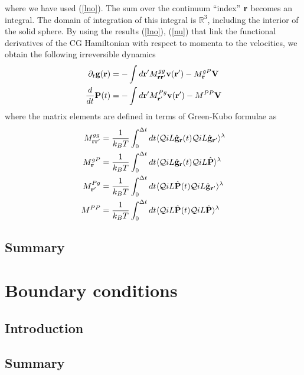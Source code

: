 \documentclass[a4paper,openright,12pt]{book}
\begin{document}
where we have  used (\ref{lno}). The sum over  the continuum ``index''
${\bf  r}$ becomes  an integral.   The domain  of integration  of this
integral  is  $\mathbb{R}^3$,  including  the interior  of  the  solid
sphere. By  using the  results (\ref{lno}),  (\ref{nu}) that  link the
functional derivatives of  the CG Hamiltonian with  respect to momenta
to the velocities, we obtain the following irreversible dynamics
\begin{align}
  \partial_t{\bf g}({\bf r})&=-\int d{\bf r}'M^{gg}_{{\bf r}{\bf r}'}
{\bf v}({\bf r}')-M^{gP}_{\bf r}{\bf V}
\nonumber\\
\frac{d}{dt}{\bf P}(t)&=-\int d{\bf r}' M^{Pg}_{{\bf r}'}{\bf v}({\bf r}')-M^{PP}{\bf V}
\label{IrrMark1}\end{align}
where the matrix elements are  defined in terms of Green-Kubo formulae
as
\begin{align}
  M^{gg}_{{\bf r}{\bf r}'}&=\frac{1}{k_BT}\int_0^{\Delta t} dt\langle 
{\cal Q}  iL\hat{\bf g}_{{\bf r}}(t){\cal Q}  iL\hat{\bf g}_{{\bf r}'}\rangle^\lambda
\nonumber\\
  M^{gP}_{{\bf r}}&=\frac{1}{k_BT}\int_0^{\Delta t} dt\langle 
{\cal Q}  iL\hat{\bf g}_{\bf r}(t){\cal Q}  iL\hat{\bf P}\rangle^\lambda
\nonumber\\
  M^{Pg}_{{\bf r}'}&=\frac{1}{k_BT}\int_0^{\Delta t} dt\langle 
{\cal Q}  iL\hat{\bf P}(t){\cal Q}  iL\hat{\bf g}_{{\bf r}'}\rangle^\lambda
\nonumber\\
  M^{PP}&=\frac{1}{k_BT}\int_0^{\Delta t} dt\langle 
{\cal Q}  iL\hat{\bf P}(t){\cal Q}  iL\hat{\bf P}\rangle^\lambda
\nonumber\\
\label{Ms}
\end{align}





\section{Summary}

\chapter{Boundary conditions}\label{Chap:BC}
\section{Introduction}
\section{Summary}
\end{document}
